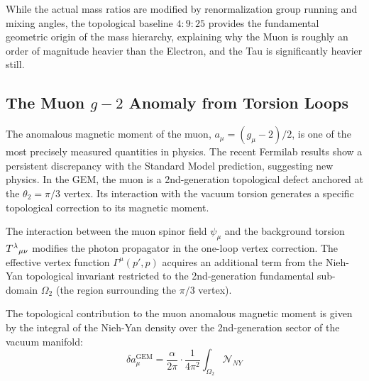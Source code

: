 While the actual mass ratios are modified by renormalization group running and mixing angles, the topological baseline $4:9:25$ provides the fundamental geometric origin of the mass hierarchy, explaining why the Muon is roughly an order of magnitude heavier than the Electron, and the Tau is significantly heavier still.
\subsection{The Muon $g-2$ Anomaly from Torsion Loops}

The anomalous magnetic moment of the muon, $a_\mu = (g_\mu - 2)/2$, is one of the most precisely measured quantities in physics. The recent Fermilab results show a persistent discrepancy with the Standard Model prediction, suggesting new physics. In the GEM, the muon is a 2nd-generation topological defect anchored at the $\theta_2 = \pi/3$ vertex. Its interaction with the vacuum torsion generates a specific topological correction to its magnetic moment.

\begin{definition}
The interaction between the muon spinor field $\psi_\mu$ and the background torsion $T^\lambda{}_{\mu\nu}$ modifies the photon propagator in the one-loop vertex correction. The effective vertex function $\Gamma^\mu(p', p)$ acquires an additional term from the Nieh-Yan topological invariant restricted to the 2nd-generation fundamental sub-domain $\Omega_2$ (the region surrounding the $\pi/3$ vertex).
\end{definition}

\begin{theorem}
\label{thm:g-2}
The topological contribution to the muon anomalous magnetic moment is given by the integral of the Nieh-Yan density over the 2nd-generation sector of the vacuum manifold:
\begin{equation}
    \delta a_\mu^{\text{GEM}} = \frac{\alpha}{2\pi} \cdot \frac{1}{4\pi^2} \int_{\Omega_2} \mathcal{N}_{NY}
\end{equation}
\end{theorem}

